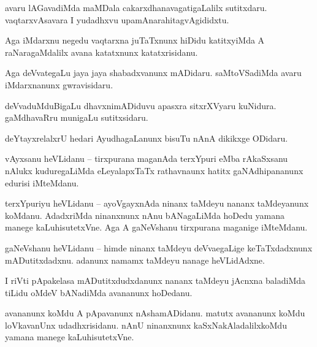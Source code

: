 \documentclass{article}
\begin{document}
\begin{mng}%
avaru lAGavadiMda maMDala cakarxdhanavagatigaLalilx sutitxdaru. vaqtarxvAsavara I yudadhxvu 
upamAnarahitagvAgididxtu.
\end{mng}

\begin{mng}%
Aga iMdarxnu negedu vaqtarxna juTaTxnunx hiDidu katitxyiMda A raNaragaMdalilx avana katatxnunx 
katatxrisidanu.
\end{mng}

\begin{mng}%
Aga deVvategaLu jaya jaya shabadxvanunx mADidaru. saMtoVSadiMda avaru iMdarxnanunx gwravisidaru.
\end{mng}

\begin{mng}%
deVvaduMduBigaLu dhavxnimADiduvu apasxra sitxrXVyaru kuNidura. gaMdhavaRru munigaLu sutitxsidaru.
\end{mng}

\begin{mng}%
deYtayxrelalxrU hedari AyudhagaLanunx bisuTu nAnA dikikxge ODidaru.
\end{mng}


\begin{mng}%
vAyxsanu heVLidanu -- tirxpurana maganAda terxYpuri eMba rAkaSxsanu nAlukx kuduregaLiMda 
eLeyalapxTaTx rathavnaunx hatitx gaNAdhipananunx edurisi iMteMdanu.
\end{mng}

\begin{mng}%
terxYpuriyu heVLidanu -- ayoVgayxnAda ninanx taMdeyu nananx taMdeyanunx koMdanu. AdadxriMda 
ninanxnunx nAnu bANagaLiMda hoDedu yamana manege kaLuhisutetxVne. Aga A gaNeVshanu tirxpurana 
maganige iMteMdanu.
\end{mng}

\begin{mng}%
gaNeVshanu heVLidanu -- himde ninanx taMdeyu deVvaegaLige keTaTxdadxnunx mADutitxdadxnu. adanunx 
namamx taMdeyu nanage heVLidAdxne.
\end{mng}

\begin{mng}%
I riVti pApakelasa mADutitxdudxdanunx nananx taMdeyu jAcnxna baladiMda tiLidu oMdeV bANadiMda 
avananunx hoDedanu.
\end{mng}

\begin{mng}%
avananunx koMdu A pApavanunx nAshamADidanu. matutx avananunx koMdu loVkavanUnx udadhxrisidanu. nAnU 
ninanxnunx kaSxNakAladalilxkoMdu yamana manege kaLuhisutetxVne.
\end{mng}
\end{document}
